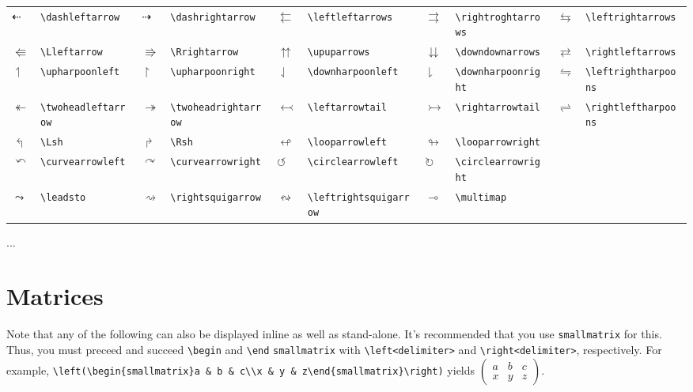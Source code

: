 \documentclass[10pt, english]{article}
\begin{document}
	\begin{center}
		\scriptsize
	\begin{tabular}{ll|ll|ll|ll|ll}
		$\dashleftarrow$ & \verb|\dashleftarrow| & $\dashrightarrow$ & \verb|\dashrightarrow| & $\leftleftarrows$ & \verb|\leftleftarrows| & $\rightrightarrows$ & \verb|\rightroghtarrows| & $\leftrightarrows$ & \verb|\leftrightarrows| \\ 
		$\Lleftarrow$ & \verb|\Lleftarrow| & $\Rrightarrow$ & \verb|\Rrightarrow| & $\upuparrows$ & \verb|\upuparrows| & $\downdownarrows$ & \verb|\downdownarrows| & $\rightleftarrows$ & \verb|\rightleftarrows| \\
		$\upharpoonleft$ & \verb|\upharpoonleft| & $\upharpoonright$ & \verb|\upharpoonright| & $\downharpoonleft$ & \verb|\downharpoonleft| & $\downharpoonright$ & \verb|\downharpoonright| & $\leftrightharpoons$ & \verb|\leftrightharpoons|\\
		$\twoheadleftarrow$ & \verb|\twoheadleftarrow| & $\twoheadrightarrow$ & \verb|\twoheadrightarrow| & $\leftarrowtail$ & \verb|\leftarrowtail| & $\rightarrowtail$ & \verb|\rightarrowtail| & $\rightleftharpoons$ & \verb|\rightleftharpoons| \\
		$\Lsh$ & \verb|\Lsh| & $\Rsh$ & \verb|\Rsh| & $\looparrowleft$ & \verb|\looparrowleft| & $\looparrowright$ & \verb|\looparrowright| \\
		$\curvearrowleft$ & \verb|\curvearrowleft| & $\curvearrowright$ & \verb|\curvearrowright| & $\circlearrowleft$ & \verb|\circlearrowleft| & $\circlearrowright$ & \verb|\circlearrowright| \\
		$\leadsto$ & \verb|\leadsto| & $\rightsquigarrow$ & \verb|\rightsquigarrow| & $\leftrightsquigarrow$ & \verb|\leftrightsquigarrow| & $\multimap$ & \verb|\multimap| \\
	\end{tabular}
	\end{center}

	...

\section{Matrices}

Note that any of the following can also be displayed inline as well as stand-alone. It's recommended that you use \verb|smallmatrix| for this. Thus, you must preceed and succeed \verb|\begin| and \verb|\end| \verb|smallmatrix| with \verb|\left<delimiter>| and \verb|\right<delimiter>|, respectively. For example, \verb|\left(\begin{smallmatrix}a & b & c\\x & y & z\end{smallmatrix}\right)| yields $\left(\begin{smallmatrix}a & b & c\\x & y & z\end{smallmatrix}\right)$. 
\end{document}
